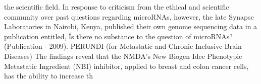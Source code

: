 \documentclass{article}
\begin{document}
the scientific field. In response to criticism from the ethical and scientific community over past questions regarding microRNAs, however, the late Synapse Laboratories in Nairobi, Kenya, published their own genome sequencing data in a publication entitled, \'Is there no substance to the question of microRNAs?\' (Publication - 2009). PERUNDI (for Metastatic and Chronic Inclusive Brain Diseases) The findings reveal that the NMDA’s New Biogen Idec Phenotypic Metastatic Ingredient (NBI) inhibitor, applied to breast and colon cancer cells, has the ability to increase th
\end{document}
